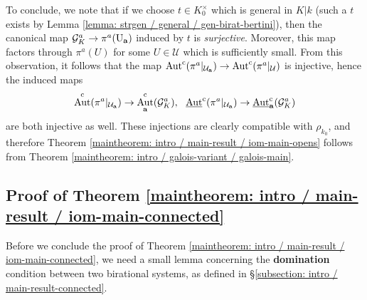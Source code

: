 \documentclass[11pt]{amsart}
\theoremstyle{definition}
\theoremstyle{remark}
\numberwithin{equation}{section}
\DeclareMathOperator{\Aut}{Aut}
\newcommand{\U}{{\rm U}}
\newcommand{\Gc}{\mathcal{G}}
\newcommand{\Ucal}{\mathcal{U}}
\newcommand{\abf}{\mathbf{a}}
\newcommand{\Autc}{\Aut^{\rm c}}
\newcommand{\UAutc}{\underline{\Aut}^{\rm c}}
\begin{document}
To conclude, we note that if we choose $t \in K_0^\times$ which is general in $K|k$ (such a $t$ exists by Lemma \ref{lemma: strgen / general / gen-birat-bertini}), then the canonical map $\Gc_K^a \rightarrow \pi^a(\U_\abf)$ induced by $t$ is \emph{surjective}.
Moreover, this map factors through $\pi^a(U)$ for some $U \in \Ucal$ which is sufficiently small.
From this observation, it follows that the map $\Autc(\pi^a|_{\Ucal_\abf}) \rightarrow \Autc(\pi^a|_\Ucal)$ is injective, hence the induced maps
\[ \Autc(\pi^a|_{\Ucal_\abf}) \rightarrow \Autc_\abf(\Gc_K^a), \ \ \UAutc(\pi^a|_{\Ucal_\abf}) \rightarrow \UAutc_\abf(\Gc_K^a) \]
are both injective as well.
These injections are clearly compatible with $\rho_{k_0}$, and therefore Theorem \ref{maintheorem: intro / main-result / iom-main-opens} follows from Theorem \ref{maintheorem: intro / galois-variant / galois-main}.

\subsection{Proof of Theorem \ref{maintheorem: intro / main-result / iom-main-connected}}
\label{subsection: finalproof / ion-main-connected}

Before we conclude the proof of Theorem \ref{maintheorem: intro / main-result / iom-main-connected}, we need a small lemma concerning the {\bf domination} condition between two birational systems, as defined in \S\ref{subsection: intro / main-result-connected}.
\end{document}
